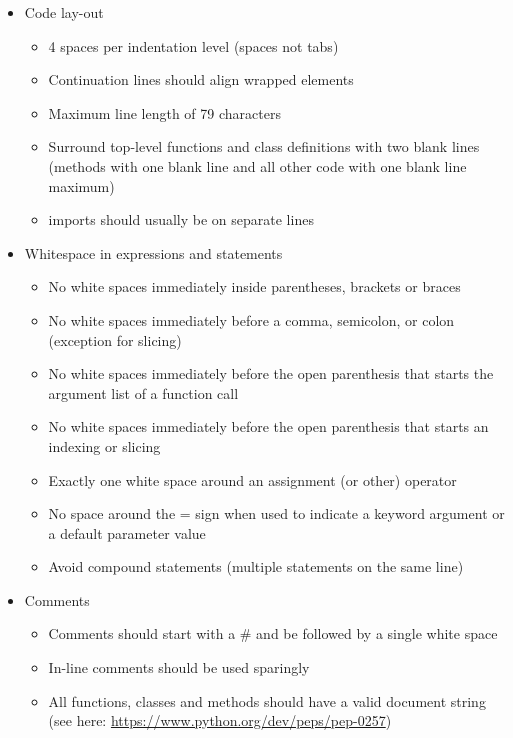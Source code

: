 \begin{itemize}
	\item Code lay-out
	\begin{itemize}
		\item 4 spaces per indentation level (spaces not tabs)
		\item Continuation lines should align wrapped elements
		\item Maximum line length of 79 characters
		\item Surround top-level functions and class definitions with two blank lines (methods with one blank line and all other code with one blank line maximum)
		\item imports should usually be on separate lines
	\end{itemize}

	\item Whitespace in expressions and statements
	\begin{itemize}
		\item No white spaces immediately inside parentheses, brackets or braces
		\item No white spaces immediately before a comma, semicolon, or colon (exception for slicing)
		\item No white spaces immediately before the open parenthesis that starts the argument list of a function call
		\item No white spaces immediately before the open parenthesis that starts an indexing or slicing
		\item Exactly one white space around an assignment (or other) operator
		\item No space around the = sign when used to indicate a keyword argument or a default parameter value
		\item Avoid compound statements (multiple statements on the same line)
	\end{itemize}

	\item Comments
	\begin{itemize}
		\item Comments should start with a \# and be followed by a single white space
		\item In-line comments should be used sparingly
		\item All functions, classes and methods should have a valid document string (see here: \url{https://www.python.org/dev/peps/pep-0257})
	\end{itemize}


\end{itemize}
